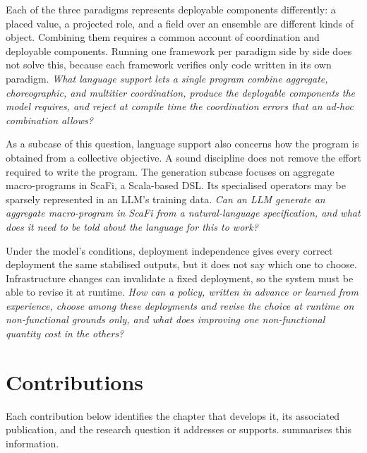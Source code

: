 Each of the three paradigms represents deployable components differently:
a placed value, a projected role, and a field over an ensemble are different kinds of object.
%
Combining them requires a common account of coordination and deployable components.
%
Running one framework per paradigm side by side does not solve this,
because each framework verifies only code written in its own paradigm.
%
\emph{What language support lets a single program combine aggregate, choreographic, and multitier coordination, produce the deployable components the model requires, and reject at compile time the coordination errors that an ad-hoc combination allows?}

As a subcase of this question, language support also concerns how the program is obtained from a collective objective.
A sound discipline does not remove the effort required to write the program.
%
The generation subcase focuses on aggregate macro-programs in ScaFi, a Scala-based \ac{DSL}.
Its specialised operators may be sparsely represented in an \ac{LLM}'s training data.
%
\emph{Can an \ac{LLM} generate an aggregate macro-program in ScaFi from a natural-language specification, and what does it need to be told about the language for this to work?}

Under the model's conditions, deployment independence gives every correct deployment the same stabilised outputs,
but it does not say which one to choose.
%
Infrastructure changes can invalidate a fixed deployment,
so the system must be able to revise it at runtime.
%
\emph{How can a policy, written in advance or learned from experience, choose among these deployments and revise the choice at runtime on non-functional grounds only, and what does improving one non-functional quantity cost in the others?}

\section{Contributions}
\label{sec:contributions}

Each contribution below identifies the chapter that develops it, its associated publication, and the research question it addresses or supports.
 summarises this information.

